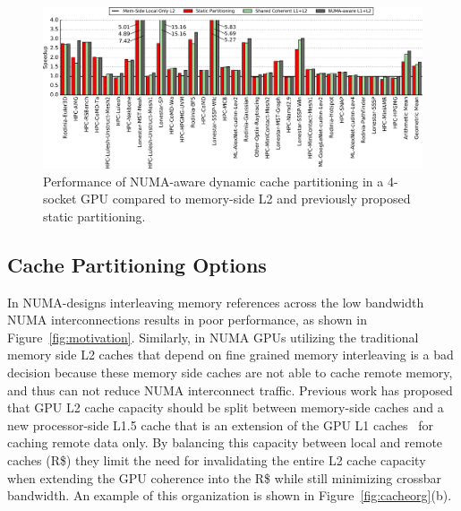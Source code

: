 \begin{figure}[t]
    \centering
    \includegraphics[width=1.0\textwidth]{figures/plot_merged_cache_WB.pdf}
    \caption{Performance of NUMA-aware dynamic cache partitioning in a 4-socket
	GPU compared to memory-side L2 and previously proposed static partitioning.}
    \label{fig:dynamiccaching}
        \vspace{-.2in}
\end{figure}

\subsection{Cache Partitioning Options}
In NUMA-designs interleaving memory references across the low bandwidth NUMA 
interconnections results in poor performance, as shown in 
Figure~\ref{fig:motivation}. Similarly, in NUMA GPUs utilizing the 
traditional memory side L2 caches that depend on fine grained memory 
interleaving is a bad decision because these memory side caches are not able 
to cache remote memory, and thus can not reduce NUMA interconnect traffic.  
Previous work has proposed that GPU L2 cache capacity should be split between 
memory-side caches and a new processor-side L1.5 cache that is an extension 
of the GPU L1 caches~\cite{Arunkumar2017} for caching remote data only. By balancing this capacity between local 
and remote caches (R\$) they limit the need for invalidating the entire 
L2 cache capacity when extending the GPU coherence into the R\$ while still 
minimizing crossbar bandwidth. An example of this organization is shown in 
Figure~\ref{fig:cacheorg}(b). 

